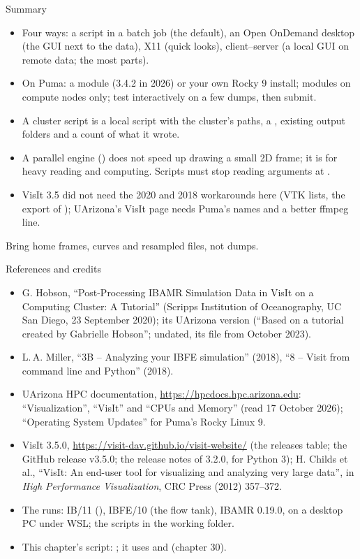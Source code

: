 \documentclass[aspectratio=169,11pt]{beamer}
\begin{document}
\begin{frame}{Summary}
\label{fr:summary}
\footnotesize
\begin{itemize}\setlength{\itemsep}{1pt}
  \item Four ways: a script in a batch job (the default), an Open OnDemand desktop (the GUI next to the data), X11 (quick looks), client--server (a local GUI on remote data; the most parts).
  \item On Puma: a  module (3.4.2 in 2026) or your own Rocky 9 install; modules on compute nodes only; test interactively on a few dumps, then submit.
  \item A cluster script is a local script with the cluster's paths, a , existing output folders and a count of what it wrote.
  \item A parallel engine () does not speed up drawing a small 2D frame; it is for heavy reading and computing. Scripts must stop reading arguments at .
  \item VisIt 3.5 did not need the 2020 and 2018 workarounds here (VTK lists, the export of ); UArizona's VisIt page needs Puma's names and a better ffmpeg line.
\end{itemize}
\begin{punchbox}
\small Bring home frames, curves and resampled files, not dumps.
\end{punchbox}
\end{frame}

\begin{frame}{References and credits}
\label{fr:refs}
\scriptsize
\begin{itemize}
  \item G. Hobson, ``Post-Processing IBAMR Simulation Data in VisIt on a Computing Cluster: A Tutorial'' (Scripps Institution of Oceanography, UC San Diego, 23 September 2020); its UArizona version (``Based on a tutorial created by Gabrielle Hobson''; undated, its file from October 2023).
  \item L.\,A. Miller, ``3B -- Analyzing your IBFE simulation'' (2018), ``8 -- Visit from command line and Python'' (2018).
  \item UArizona HPC documentation, \url{https://hpcdocs.hpc.arizona.edu}: ``Visualization'', ``VisIt'' and ``CPUs and Memory'' (read 17 October 2026); ``Operating System Updates'' for Puma's Rocky Linux 9.
  \item VisIt 3.5.0, \url{https://visit-dav.github.io/visit-website/} (the releases table; the GitHub release v3.5.0; the release notes of 3.2.0, for Python 3); H. Childs et al., ``VisIt: An end-user tool for visualizing and analyzing very large data'', in \emph{High Performance Visualization}, CRC Press (2012) 357--372.
  \item The runs: IB/11 (), IBFE/10 (the flow tank), IBAMR 0.19.0, on a desktop PC under WSL; the scripts  in the working folder.
  \item This chapter's script: ; it uses  and  (chapter 30).
\end{itemize}
\end{frame}
\end{document}
